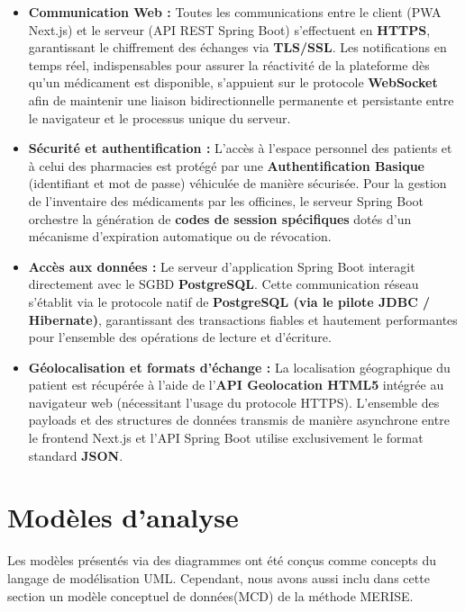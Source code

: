 \documentclass[12pt,a4paper]{report}
\begin{document}
\begin{itemize}
    \item \textbf{Communication Web :} Toutes les communications entre le client (PWA Next.js) et le serveur (API REST Spring Boot) s'effectuent en \textbf{HTTPS}, garantissant le chiffrement des échanges via \textbf{TLS/SSL}. Les notifications en temps réel, indispensables pour assurer la réactivité de la plateforme dès qu'un médicament est disponible, s'appuient sur le protocole \textbf{WebSocket} afin de maintenir une liaison bidirectionnelle permanente et persistante entre le navigateur et le processus unique du serveur.
    
    \item \textbf{Sécurité et authentification :} L'accès à l'espace personnel des patients et à celui des pharmacies est protégé par une \textbf{Authentification Basique} (identifiant et mot de passe) véhiculée de manière sécurisée. Pour la gestion de l'inventaire des médicaments par les officines, le serveur Spring Boot orchestre la génération de \textbf{codes de session spécifiques} dotés d'un mécanisme d'expiration automatique ou de révocation.
    
    \item \textbf{Accès aux données :} Le serveur d'application Spring Boot interagit directement avec le SGBD \textbf{PostgreSQL}. Cette communication réseau s'établit via le protocole natif de \textbf{PostgreSQL (via le pilote JDBC / Hibernate)}, garantissant des transactions fiables et hautement performantes pour l'ensemble des opérations de lecture et d'écriture.
    
    \item \textbf{Géolocalisation et formats d'échange :} La localisation géographique du patient est récupérée à l'aide de l'\textbf{API Geolocation HTML5} intégrée au navigateur web (nécessitant l'usage du protocole HTTPS). L'ensemble des payloads et des structures de données transmis de manière asynchrone entre le frontend Next.js et l'API Spring Boot utilise exclusivement le format standard \textbf{JSON}.
\end{itemize}
    \chapter{Modèles d'analyse}
    Les modèles présentés via des diagrammes ont été conçus comme concepts du langage de modélisation UML. Cependant, nous avons aussi inclu dans cette section un modèle conceptuel de données(MCD) de la méthode MERISE.
\end{document}
